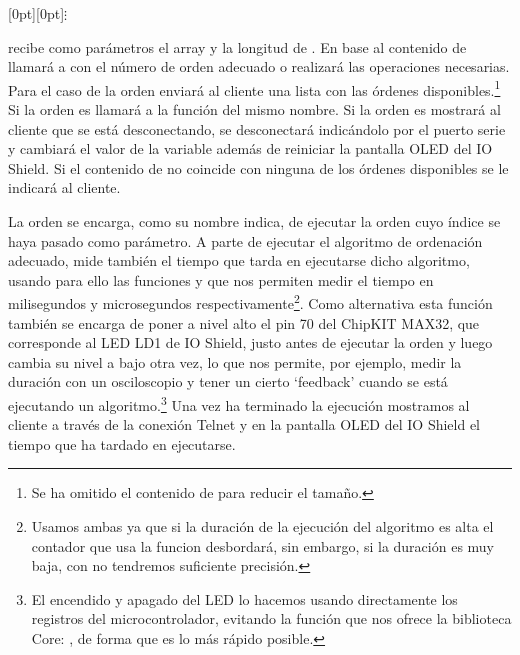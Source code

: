 
\centerline{\raisebox{-1pt}[0pt][0pt]{$\vdots$}}

 recibe como parámetros el array  y la longitud de . En base al contenido de  llamará a  con el número de orden adecuado o realizará las operaciones necesarias. Para el caso de la orden  enviará al cliente una lista con las órdenes disponibles.\footnote{Se ha omitido el contenido de  para reducir el tamaño.} Si la orden es  llamará a la función del mismo nombre. Si la orden es  mostrará al cliente que se está desconectando, se desconectará indicándolo por el puerto serie y cambiará el valor de la variable  además de reiniciar la pantalla OLED del IO Shield. Si el contenido de  no coincide con ninguna de los órdenes disponibles se le indicará al cliente.


La orden  se encarga, como su nombre indica, de ejecutar la orden cuyo índice se haya pasado como parámetro. A parte de ejecutar el algoritmo de ordenación adecuado,  mide también el tiempo que tarda en ejecutarse dicho algoritmo, usando para ello las funciones  y  que nos permiten medir el tiempo en milisegundos y microsegundos respectivamente\footnote{Usamos ambas ya que si la duración de la ejecución del algoritmo es alta el contador que usa la funcion  desbordará, sin embargo, si la duración es muy baja, con  no tendremos suficiente precisión.}. Como alternativa esta función también se encarga de poner a nivel alto el pin 70 del ChipKIT MAX32, que corresponde al LED LD1 de IO Shield, justo antes de ejecutar la orden y luego cambia su nivel a bajo otra vez, lo que nos permite, por ejemplo, medir la duración con un osciloscopio y tener un cierto `feedback' cuando se está ejecutando un algoritmo.\footnote{El encendido y apagado del LED lo hacemos usando directamente los registros del microcontrolador, evitando la función que nos ofrece la biblioteca Core: , de forma que es lo más rápido posible.} Una vez ha terminado la ejecución mostramos al cliente a través de la conexión Telnet y en la pantalla OLED del IO Shield el tiempo que ha tardado en ejecutarse.

